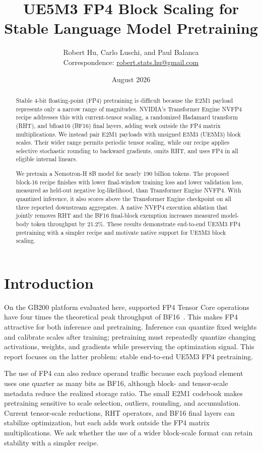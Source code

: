 \documentclass[11pt]{article}
\title{UE5M3 FP4 Block Scaling for Stable Language Model Pretraining}
\author{Robert Hu, Carlo Luschi, and Paul Balanca\\[1.5mm]
  \mdseries\small Correspondence:
  \href{mailto:robert.stats.hu@gmail.com}{robert.stats.hu@gmail.com}}
\date{August 2026}
\newcommand{\ue}{UE5M3}
\newcommand{\uefp}{UE5M3 FP4}
\newcommand{\nv}{NVFP4}
\begin{document}
\maketitle

\begin{abstract}
Stable 4-bit floating-point (FP4) pretraining is difficult because the E2M1
payload represents only a narrow range of magnitudes.  NVIDIA's Transformer
Engine \nv{} recipe addresses this with current-tensor scaling, a randomized
Hadamard transform (RHT), and bfloat16 (BF16) final layers, adding work outside
the FP4 matrix multiplications.  We instead pair E2M1 payloads with unsigned
E5M3 (\ue{}) block scales.  Their wider range permits periodic tensor scaling,
while our recipe applies selective stochastic rounding to backward gradients,
omits RHT, and uses FP4 in all eligible internal linears.

We pretrain a Nemotron-H 8B model for nearly 190 billion tokens.  The proposed
block-16 recipe finishes with lower final-window training loss and lower
validation loss, measured as held-out negative log-likelihood, than
Transformer Engine \nv{}.  With
quantized inference, it also scores above the Transformer Engine checkpoint on
all three reported downstream aggregates.  A native \nv{} execution ablation
that jointly removes RHT and the BF16 final-block exemption increases measured
model-body token throughput by 21.2\%.  These results demonstrate end-to-end
\uefp{} pretraining with a simpler recipe and motivate native support for
\ue{} block scaling.
\end{abstract}

\section{Introduction}

On the GB200 platform evaluated here, supported FP4 Tensor Core operations have
four times the theoretical peak throughput of BF16~\citep{nvidia2025nvfp4}.
This makes FP4 attractive for both inference and pretraining.  Inference can quantize fixed weights and
calibrate scales after training; pretraining must repeatedly quantize changing
activations, weights, and gradients while preserving the optimization signal.
This report focuses on the latter problem: stable end-to-end \uefp{}
pretraining.

The use of FP4 can also reduce operand traffic because each payload element uses one
quarter as many bits as BF16, although block- and tensor-scale metadata reduce
the realized storage ratio.  The small E2M1 codebook makes pretraining
sensitive to scale selection, outliers, rounding, and accumulation.  Current
tensor-scale reductions, RHT operators, and BF16 final layers can stabilize
optimization, but each adds work outside the FP4 matrix multiplications.  We
ask whether the use of a wider block-scale format can retain stability with a simpler
recipe.
\end{document}

